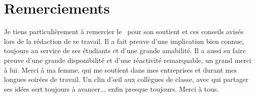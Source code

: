 \chapter*{Remerciements}

Je tiens particulièrement à remercier le \Advisor \ pour son soutient et ces conseils avisés lors de la rédaction de se travail. Il a fait preuve d'une implication bien connue, toujours au service de ses étudiants et d'une grande amabilité. Il a aussi su faire preuve d'une grande disponibilité et d'une réactivité remarquable, un grand merci à lui. Merci à ma femme, qui me soutient dans mes entreprises et durant mes longues soirées de travail. Un clin d'œil aux collègues de classe, avec qui partager ses idées sert toujours à avancer... enfin presque toujours. Merci à tous.
